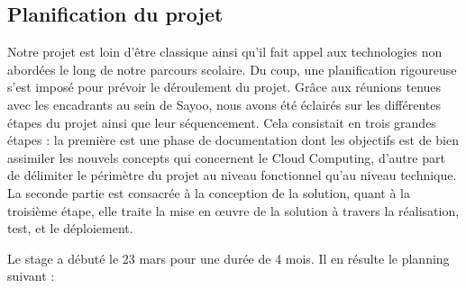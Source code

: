 \begin{onehalfspace}
\section{Planification du projet}

Notre projet est loin d'être classique ainsi qu'il fait appel aux technologies non abordées le long de notre parcours scolaire. Du coup, une planification rigoureuse s'est imposé pour prévoir le déroulement du projet. Grâce aux réunions tenues avec les encadrants au sein de Sayoo, nous avons été éclairés sur les différentes étapes du projet ainsi que leur séquencement. Cela consistait en trois grandes étapes : la première est une phase de documentation dont les objectifs est de bien assimiler les nouvels concepts qui concernent le Cloud Computing, d'autre part de délimiter le périmètre du projet au niveau fonctionnel qu'au niveau technique. La seconde partie est consacrée à la conception de la solution, quant à la troisième étape, elle traite la mise en œuvre de la solution à travers la réalisation, test, et le déploiement.

Le stage a débuté le 23 mars pour une durée de 4 mois. Il en résulte le planning suivant :


\end{onehalfspace}
